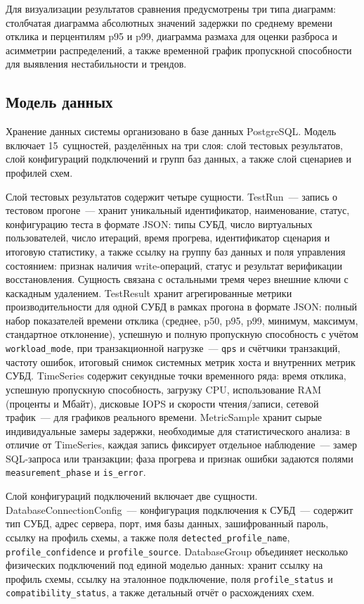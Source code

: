 Для визуализации результатов сравнения предусмотрены три типа диаграмм: столбчатая диаграмма абсолютных значений задержки по среднему времени отклика и перцентилям p95 и p99, диаграмма размаха для оценки разброса и асимметрии распределений, а также временной график пропускной способности для выявления нестабильности и трендов.

\subsection{Модель данных}

Хранение данных системы организовано в базе данных PostgreSQL. Модель включает 15~сущностей, разделённых на три слоя: слой тестовых результатов, слой конфигураций подключений и групп баз данных, а также слой сценариев и профилей схем.

Слой тестовых результатов содержит четыре сущности. TestRun~--- запись о тестовом прогоне~--- хранит уникальный идентификатор, наименование, статус, конфигурацию теста в формате JSON: типы СУБД, число виртуальных пользователей, число итераций, время прогрева, идентификатор сценария и итоговую статистику, а также ссылку на группу баз данных и поля управления состоянием: признак наличия write-операций, статус и результат верификации восстановления. Сущность связана с остальными тремя через внешние ключи с каскадным удалением. TestResult хранит агрегированные метрики производительности для одной СУБД в рамках прогона в формате JSON: полный набор показателей времени отклика (среднее, p50, p95, p99, минимум, максимум, стандартное отклонение), успешную и полную пропускную способность с учётом \texttt{workload\_mode}, при транзакционной нагрузке~--- \texttt{qps} и счётчики транзакций, частоту ошибок, итоговый снимок системных метрик хоста и внутренних метрик СУБД. TimeSeries содержит секундные точки временного ряда: время отклика, успешную пропускную способность, загрузку CPU, использование RAM (проценты и Мбайт), дисковые IOPS и скорости чтения/записи, сетевой трафик~--- для графиков реального времени. MetricSample хранит сырые индивидуальные замеры задержки, необходимые для статистического анализа: в отличие от TimeSeries, каждая запись фиксирует отдельное наблюдение~--- замер SQL-запроса или транзакции; фаза прогрева и признак ошибки задаются полями \texttt{measurement\_phase} и \texttt{is\_error}.

Слой конфигураций подключений включает две сущности. DatabaseConnectionConfig~--- конфигурация подключения к СУБД~--- содержит тип СУБД, адрес сервера, порт, имя базы данных, зашифрованный пароль, ссылку на профиль схемы, а также поля \texttt{detected\_profile\_name}, \texttt{profile\_confidence} и \texttt{profile\_source}. DatabaseGroup объединяет несколько физических подключений под единой моделью данных: хранит ссылку на профиль схемы, ссылку на эталонное подключение, поля \texttt{profile\_status} и \texttt{compatibility\_status}, а также детальный отчёт о расхождениях схем.

